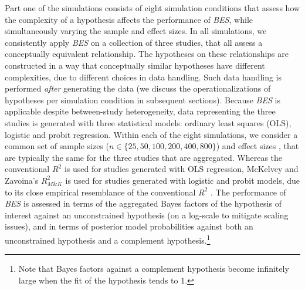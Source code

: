 \documentclass[review, 3p, authoryear]{elsarticle} %
\begin{document}
Part one of the simulations consists of eight simulation conditions that assess how the complexity of a hypothesis affects the performance of \emph{BES}, while simultaneously varying the sample and effect sizes.
In all simulations, we consistently apply \emph{BES} on a collection of three studies, that all assess a conceptually equivalent relationship.
The hypotheses on these relationships are constructed in a way that conceptually similar hypotheses have different complexities, due to different choices in data handling.
Such data handling is performed \emph{after} generating the data (we discuss the operationalizations of hypotheses per simulation condition in subsequent sections).
Because \emph{BES} is applicable despite between-study heterogeneity, data representing the three studies is generated with three statistical models: ordinary least squares (OLS), logistic and probit regression.
Within each of the eight simulations, we consider a common set of sample sizes (\(n \in \{25, 50, 100, 200, 400, 800\}\)) and effect sizes \citep[\(R^2 \in \{0.02, 0.09, 0.25\}\), corresponding to small, medium and large effects as defined by][]{cohen_1988}, that are typically the same for the three studies that are aggregated.
Whereas the conventional \(R^2\) is used for studies generated with OLS regression, McKelvey and Zavoina's \(R^2_{M\&K}\) \citeyearpar{mckelvey_zavoina_1975} is used for studies generated with logistic and probit models, due to its close empirical resemblance of the conventional \(R^2\) \citep{hagle_mitchell_goodness_1992, demaris_explained_2002}.
The performance of \emph{BES} is assessed in terms of the aggregated Bayes factors of the hypothesis of interest against an unconstrained hypothesis (on a log-scale to mitigate scaling issues), and in terms of posterior model probabilities against both an unconstrained hypothesis and a complement hypothesis.\footnote{Note that Bayes factors against a complement hypothesis become infinitely large when the fit of the hypothesis tends to \(1\).}
\end{document}
